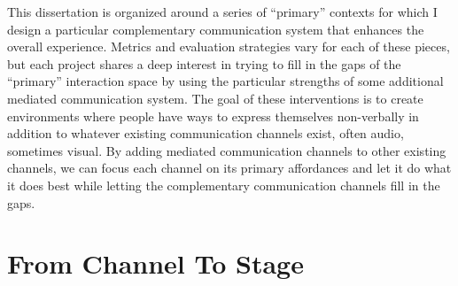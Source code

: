 


This dissertation is organized around a series of ``primary'' contexts for which I design a particular complementary communication system that enhances the overall experience. Metrics and evaluation strategies vary for each of these pieces, but each project shares a deep interest in trying to fill in the gaps of the ``primary'' interaction space by using the particular strengths of some additional mediated communication system. The goal of these interventions is to create environments where people have ways to express themselves non-verbally in addition to whatever existing communication channels exist, often audio, sometimes visual. By adding mediated communication channels to other existing channels, we can focus each channel on its primary affordances and let it do what it does best while letting the complementary communication channels fill in the gaps.


\section{From Channel To Stage}

